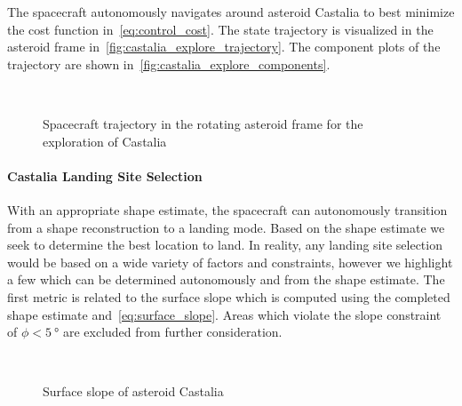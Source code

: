 \documentclass[letterpaper, paper,11pt]{AAS}		%
\begin{document}
The spacecraft autonomously navigates around asteroid Castalia to best minimize the cost function in~\cref{eq:control_cost}.
The state trajectory is visualized in the asteroid frame in~\cref{fig:castalia_explore_trajectory}.
The component plots of the trajectory are shown in~\cref{fig:castalia_explore_components}.
\begin{figure}[htbp]
    \centering
    \\%
    \caption{Spacecraft trajectory in the rotating asteroid frame for the exploration of Castalia~\label{fig:castalia_trajectory}}
\end{figure}

\paragraph{Castalia Landing Site Selection}

With an appropriate shape estimate, the spacecraft can autonomously transition from a shape reconstruction to a landing mode.
Based on the shape estimate we seek to determine the best location to land. 
In reality, any landing site selection would be based on a wide variety of factors and constraints, however we highlight a few which can be determined autonomously and from the shape estimate.
The first metric is related to the surface slope which is computed using the completed shape estimate and~\cref{eq:surface_slope}.
Areas which violate the slope constraint of \( \phi < \SI{5}{\degree} \) are excluded from further consideration.
\begin{figure}[htbp]
    \centering
    \\%
    \caption{Surface slope of asteroid Castalia\label{fig:surface_slope_castalia_both}}
\end{figure}
\end{document}
